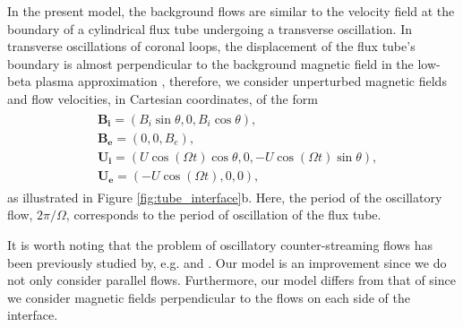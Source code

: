 In the present model, the background flows are similar to the velocity field at the boundary of a cylindrical flux tube undergoing a transverse oscillation.
In transverse oscillations of coronal loops, the displacement of the flux tube's boundary is almost perpendicular to the background magnetic field in the low-beta plasma approximation \citep[see, e.g.][]{Ruderman2007}, therefore, we consider unperturbed magnetic fields and flow velocities, in Cartesian coordinates, of the form
%
\begin{align}
\begin{split}
\label{eq:c3equilibrium}
& \mathbf{B_i} = (B_i \sin \theta, 0, B_i \cos \theta),
\\
& \mathbf{B_e} = (0, 0, B_e),
\\
& \mathbf{U_i} = (U \cos(\Omega t) \cos \theta, 0, - U \cos(\Omega t) \sin \theta),
\\
& \mathbf{U_e} = (- U \cos(\Omega t), 0, 0),
\end{split}
\end{align}
%
as illustrated in Figure \ref{fig:tube_interface}b.
Here, the period of the oscillatory flow, $2\pi / \Omega$, corresponds to the period of oscillation of the flux tube.

It is worth noting that the problem of oscillatory counter-streaming flows has been previously studied by, e.g. \cite{Kelly1965} and \cite{Roberts1973}.
Our model is an improvement since we do not only consider parallel flows.
Furthermore, our model differs from that of \cite{Roberts1973} since we consider magnetic fields perpendicular to the flows on each side of the interface.

